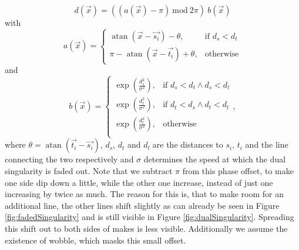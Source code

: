 \documentclass{utue} %
\DeclareMathOperator{\atan}{atan}
\begin{document}
$$
d(\vec{x}) = ((a(\vec{x})-\pi)\ \mathrm{mod}\ 2\pi)\ b(\vec{x})
$$
with
$$
  a(\vec{x}) = \begin{cases}
  \atan(\vec{x}-\vec{s_i}) - \theta, &\text{if }d_s < d_t\\
  \pi - \atan(\vec{x}-\vec{t_i}) + \theta, &\text{otherwise}
  \end{cases}
$$
and
$$
  b(\vec{x}) = \begin{cases}
    \exp(\frac{d_s^2}{\sigma^2}), &\text{if }d_s < d_t \land d_s < d_l\\
    \exp(\frac{d_t^2}{\sigma^2}), &\text{if }d_t < d_s \land d_t < d_l\\
    \exp(\frac{d_l^2}{\sigma^2}), &\text{otherwise}\\
  \end{cases},
$$
where $\theta=\atan(\vec{t_i}-\vec{s_i})$, $d_s$, $d_t$ and $d_l$ are the distances to $s_i$, $t_i$ and the line connecting the two respectively and $\sigma$ determines the speed at which the dual singularity is faded out. Note that we subtract $\pi$ from this phase offset, to make one side dip down a little, while the other one increase, instead of just one increasing by twice as much. The reason for this is, that to make room for an additional line, the other lines shift slightly as can already be seen in Figure \ref{fig:fadedSingularity} and is still visible in Figure \ref{fig:dualSingularity}. Spreading this shift out to both sides of makes is less visible. Additionally we assume the existence of wobble, which masks this small offset.
\end{document}
